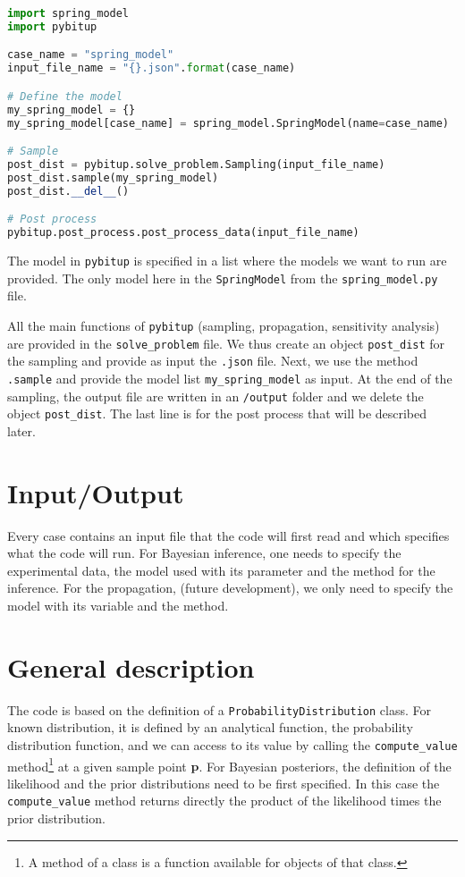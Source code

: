 \documentclass[a4paper,11pt]{article}
\begin{document}
\begin{lstlisting}[language=Python, breaklines=true, tabsize=4, backgroundcolor=\color{codegray}]
import spring_model 
import pybitup

case_name = "spring_model"
input_file_name = "{}.json".format(case_name) 

# Define the model 
my_spring_model = {} 
my_spring_model[case_name] = spring_model.SpringModel(name=case_name)

# Sample 
post_dist = pybitup.solve_problem.Sampling(input_file_name)
post_dist.sample(my_spring_model)
post_dist.__del__()

# Post process 
pybitup.post_process.post_process_data(input_file_name)

\end{lstlisting}

The model in \texttt{pybitup} is specified in a list where the models we want to run are provided. The only model here in the \texttt{SpringModel} from the \texttt{spring\_model.py} file. 

All the main functions of \texttt{pybitup} (sampling, propagation, sensitivity analysis) are provided in the \texttt{solve\_problem} file. We thus create an object \texttt{post\_dist} for the sampling and provide as input the \texttt{.json} file. Next, we use the method \texttt{.sample} and provide the model list \texttt{my\_spring\_model} as input. At the end of the sampling, the output file are written in an \texttt{/output} folder and we delete the object \texttt{post\_dist}. The last line is for the post process that will be described later. 


\section{Input/Output} 

Every case contains an input file that the code will first read and which specifies what the code will run. For Bayesian inference, one needs to specify the experimental data, the model used with its parameter and the method for the inference. For the propagation, (future development), we only need to specify the model with its variable and the method. 


\section{General description} 

The code is based on the definition of a \texttt{ProbabilityDistribution} class. For known distribution, it is defined by an analytical function, the probability distribution function, and we can access to its value by calling the \texttt{compute\_value} method\footnote{A method of a class is a function available for objects of that class.} at a given sample point $\textbf{p}$. For Bayesian posteriors, the definition of the likelihood and the prior distributions need to be first specified. In this case the \texttt{compute\_value} method returns directly the product of the likelihood times the prior distribution. 
\end{document}
